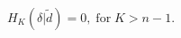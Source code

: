 \begin{equation}
H_{K}\left( \delta |\tilde{d}\right) =0,\;\mathrm{for}\;K>n-1.  \label{c7}
\end{equation}

